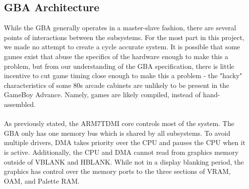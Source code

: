 \documentclass[11pt,a4paper]{article}
\begin{document}
	\subsection{GBA Architecture}
	While the GBA generally operates in a master-slave fashion, there are several points of interactions between the subsystems. For the most part in this project, we made no attempt to create a cycle accurate system. It is possible that some games exist that abuse the specifics of the hardware enough to make this a problem, but from our understanding of the GBA specification, there is little incentive to cut game timing close enough to make this a problem - the "hacky" characteristics of some 80s arcade cabinets are unlikely to be present in the GameBoy Advance. Namely, games are likely compiled, instead of hand-assembled.\\\\
	As previously stated, the ARM7TDMI core controls most of the system. The GBA only has one memory bus which is shared by all subsystems. To avoid multiple drivers, DMA takes priority over the CPU and pauses the CPU when it is active. Additionally, the CPU and DMA cannot read from graphics memory outside of VBLANK and HBLANK. While not in a display blanking period, the graphics has control over the memory ports to the three sections of VRAM, OAM, and Palette RAM. \\\\
	
\end{document}
